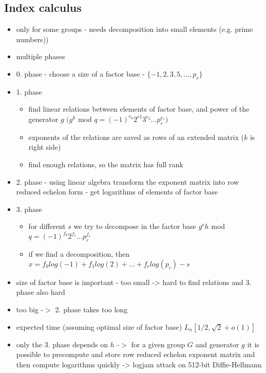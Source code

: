 \subsection*{Index calculus}
\begin{itemize}
	\item only for some groups - needs decomposition into small elements (e.g. prime numbers))
	\item multiple phases
	\item 0. phase - choose a size of a factor base - $\{ -1, 2, 3, 5, ..., p_r\}$
	\item 1. phase 
	\begin{itemize}
		\item find linear relations between elements of factor base, and power of the generator $g$ $(g^k$ mod $q = (-1)^{e_0}2^{e1}3^{e_2}...p_r^{e_r})$
		\item exponents of the relations are saved as rows of an extended matrix ($k$ is right side)
		\item find enough relations, so the matrix has full rank
	\end{itemize}
	\item 2. phase - using linear algebra transform the exponent matrix into row reduced echelon form - get logarithms of elements of factor base
	\item 3. phase
		\begin{itemize}
			\item for different $s$ we try to decompose in the factor base $g^s h$ mod $q = (-1)^{f_0}2^{f_1}...p_r^{f_r}$
			\item if we find a decomposition, then $x = f_0 log(-1) + f_1 log(2) + ... + f_r log(p_r) - s$
		\end{itemize}
	\item size of factor base is important - too small -> hard to find relations and 3. phase also hard
	\item too big -$>$ 2. phase takes too long
	\item expected time (assuming optimal size of factor base) $L_n[1/2,\sqrt{2}+o(1)]$
	\item only the 3. phase depends on $h$ -$>$ for a given group $G$ and generator $g$ it is possible to precompute and store row reduced echelon exponent matrix and then compute logarithms quickly -> logjam attack on 512-bit Diffie-Hellmann 
\end{itemize}